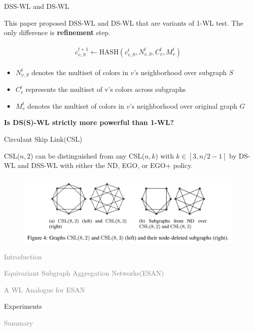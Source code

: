 \documentclass[aspectratio=169,mathserif]{beamer}  %
\newcommand{\light}[1]{\textcolor{gray}{#1}}
\newcommand{\tb}{\textbf}
\begin{document}
\begin{frame}{DSS-WL and DS-WL}

This paper proposed DSS-WL and DS-WL that are variants of 1-WL test.
The only difference is \tb{refinement} step.

\begin{eqnarray*}
\begin{aligned}
c_{v,S}^{t+1} \gets \text{HASH}(c_{v,S}^{t}, N_{v,S}^{t}, C_{v}^{t}, M_{v}^{t})
\end{aligned}    
\end{eqnarray*}

\begin{itemize}
    \item $N_{v,S}^{t}$ denotes the multiset of colors in $v$’s neighborhood over subgraph $S$
    \item $C_{v}^{t}$ represents the multiset of v’s colors across subgraphs
    \item $M_{v}^{t}$ denotes the multiset of colors in $v$’s neighborhood over original graph $G$
\end{itemize}

\pause

\tb{Is DS(S)-WL strictly more powerful than 1-WL?}

\end{frame}



\begin{frame}{Circulant Skip Link(CSL)}

CSL($n,2$) can be distinguished from any CSL($n,k$) with $k\in[3,n/2-1]$ by DS-WL and DSS-WL with either the ND, EGO, or EGO+ policy.

\begin{figure}[t]
\centerline{\includegraphics[width=0.9\linewidth]{figure4.png}}
\end{figure}
    
\end{frame}



\begin{frame}[noframenumbering]
\begin{itemize}
    \begin{LARGE}
    \item \light{Introduction}
    \item \light{Equivariant Subgraph Aggregation Networks(ESAN)}
    \item \light{A WL Analogue for ESAN}
    \item Experiments
    \item \light{Summary}
    \end{LARGE}
\end{itemize}
\end{frame}
\end{document}
